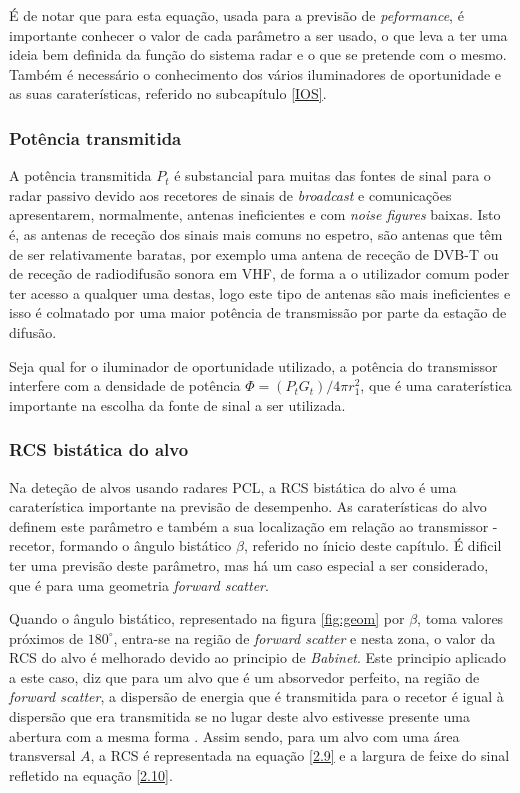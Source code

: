 É de notar que para esta equação, usada para a previsão de \textit{peformance}, é importante conhecer o valor de cada parâmetro a ser usado, o que leva a ter uma ideia bem definida da função do sistema radar e o que se pretende com o mesmo. Também é necessário o conhecimento dos vários iluminadores de oportunidade e as suas caraterísticas, referido no subcapítulo \ref{IOS}.\par 


\subsubsection*{Potência transmitida}
A potência transmitida $P_{t}$ é substancial para muitas das fontes de sinal para o radar passivo devido aos recetores de sinais de \textit{broadcast} e comunicações apresentarem, normalmente, antenas ineficientes e com \textit{noise figures} baixas. Isto é, as antenas de receção dos sinais mais comuns no espetro, são antenas que têm de ser relativamente baratas, por exemplo uma antena de receção de \gls{DVB-T} ou de receção de radiodifusão sonora em \gls{VHF}, de forma a o utilizador comum poder ter acesso a qualquer uma destas, logo este tipo de antenas são mais ineficientes e isso é colmatado por uma maior potência de transmissão por parte da estação de difusão.\par 
Seja qual for o iluminador de oportunidade utilizado, a potência do transmissor interfere com a densidade de potência $\Phi =(P_{t}G_{t})/4\pi r^{2}_{1}$, que é uma caraterística importante na escolha da fonte de sinal a ser utilizada. 

\subsubsection*{\gls{RCS} bistática do alvo}
Na deteção de alvos usando radares \gls{PCL}, a \gls{RCS} bistática do alvo é uma caraterística importante na previsão de desempenho. As caraterísticas do alvo definem este parâmetro e também a sua localização em relação ao transmissor - recetor, formando o ângulo bistático $\beta$, referido no ínicio deste capítulo. É dificil ter uma previsão deste parâmetro, mas há um caso especial a ser considerado, que é para uma geometria \textit{forward scatter}. \par 
Quando o ângulo bistático, representado na figura \ref{fig:geom} por $\beta$, toma valores próximos de $180^{\circ}$, entra-se na região de \textit{forward scatter} e nesta zona, o valor da \gls{RCS} do alvo é melhorado devido ao principio de \textit{Babinet}. Este principio aplicado a este caso, diz que para um alvo que é um absorvedor perfeito, na região de \textit{forward scatter}, a dispersão de energia que é transmitida para o recetor é igual à dispersão que era transmitida se no lugar deste alvo estivesse presente uma abertura com a mesma forma \parencite{Griffiths2005}. Assim sendo, para um alvo com uma área transversal $A$, a \gls{RCS} é representada na equação \ref{2.9} e a largura de feixe do sinal refletido na equação \ref{2.10}.

